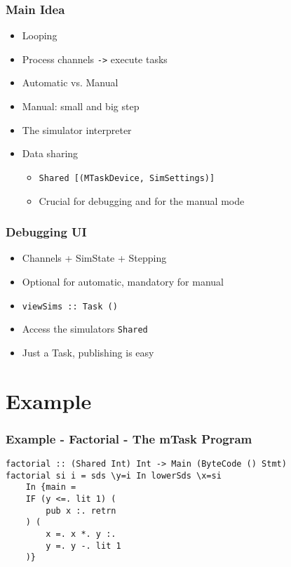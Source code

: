 \documentclass[department=icis, notes={show notes}, slidesperpage=1, official=true,showdate=true,slidenumbers=relative]{beamerruhuisstijl}
\begin{document}
\begin{frame}[fragile]
  \frametitle{Main Idea}
  \begin{itemize}
      \setlength\itemsep{1em}
      \item Looping
      \item Process channels \texttt{->} execute tasks
      \item Automatic vs. Manual
      \item Manual: small and big step
      \item The simulator interpreter
      \item Data sharing
      \begin{itemize}[label=$\diamond$]
          \item \texttt{Shared [(MTaskDevice, SimSettings)]}
          \item Crucial for debugging and for the manual mode
      \end{itemize}
  \end{itemize}
\end{frame}

\begin{frame}[fragile]
  \frametitle{Debugging UI}
  \begin{itemize}
      \setlength\itemsep{1em}
      \item Channels + SimState + Stepping
      \item Optional for automatic, mandatory for manual
      \item \texttt{viewSims :: Task ()}
      \item Access the simulators \texttt{Shared}
      \item Just a Task, publishing is easy
  \end{itemize}
\end{frame}

\section{Example}
\begin{frame}[fragile]
  \frametitle{Example - Factorial - The mTask Program}
  \begin{lstlisting}
factorial :: (Shared Int) Int -> Main (ByteCode () Stmt)
factorial si i = sds \y=i In lowerSds \x=si 
    In {main =
    IF (y <=. lit 1) (
		pub x :. retrn
	) (
		x =. x *. y :.
		y =. y -. lit 1
	)}
    \end{lstlisting}
\end{frame}
\end{document}
